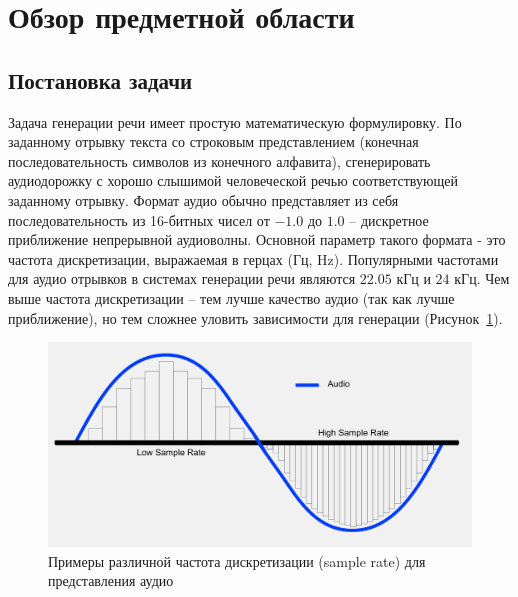 \section{Обзор предметной области}

\subsection{Постановка задачи}

Задача генерации речи имеет простую математическую формулировку. По заданному отрывку текста со строковым представлением (конечная последовательность символов из конечного алфавита), сгенерировать аудиодорожку с хорошо слышимой человеческой речью соответствующей заданному отрывку. Формат аудио обычно представляет из себя последовательность из 16-битных чисел от $-1.0$ до $1.0$ -- дискретное приближение непрерывной аудиоволны. Основной параметр такого формата - это частота дискретизации, выражаемая в герцах (Гц, Hz). Популярными частотами для аудио отрывков в системах генерации речи являются $22.05$ кГц и $24$ кГц. Чем выше частота дискретизации -- тем лучше качество аудио (так как лучше приближение), но тем сложнее уловить зависимости для генерации (Рисунок~\ref{fig:sample-rate}).

\begin{figure}[!ht]
\centering
\includegraphics[width=1.0\textwidth]{images/sample-rate.png}
\caption{Примеры различной частота дискретизации (sample rate) для представления аудио}
\label{fig:sample-rate}
\end{figure}


